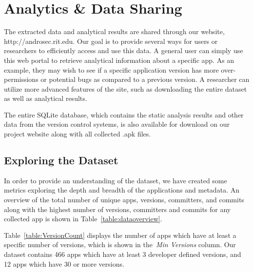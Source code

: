\documentclass[conference]{IEEEtran}
\begin{document}
\vspace{-1.8 mm}


\section{Analytics \& Data Sharing}
\label{sec: Website}

The extracted data and analytical results are shared through our website, http://androsec.rit.edu. Our goal is to provide several ways for users or researchers to efficiently access and use this data. A general user can simply use this web portal to retrieve analytical information about a specific app. As an example, they may wish to see if a specific application version has more over-permissions or potential bugs as compared to a previous version. A researcher can utilize more advanced features of the site, such as downloading the entire dataset as well as analytical results.

The entire SQLite database, which contains the static analysis results and other data from the version control systems, is also available for download on our project website along with all collected .apk files.

\subsection{Exploring the Dataset}
In order to provide an understanding of the dataset, we have created some metrics exploring the depth and breadth of the applications and metadata. An overview of the total number of unique apps, versions, committers, and commits along with the highest number of versions, committers and commits for any collected app is shown in Table~\ref{table:dataoverview}.


Table~\ref{table:VersionCount} displays the number of apps which have at least a specific number of versions, which is shown in the~\emph{Min Versions} column. Our dataset contains 466 apps which have at least 3 developer defined versions, and 12 apps which have 30 or more versions.
\end{document}
